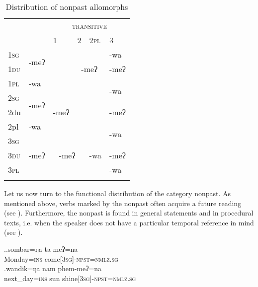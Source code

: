 \begin{table}
\begin{centering} 
\begin{tabular}{llp{1.4cm}p{1.4cm}lp{1.4cm}}
\lsptoprule
		& {\multirow{2}{*}{\scshape intransitive}}&	\multicolumn{4}{c}{ {\scshape transitive}}  \\
		&&	 {\scshape 1}&  {\scshape 2}&  {\scshape 2pl} &  {\scshape 3} \\
\midrule
 {\scshape 1sg} 		&\multirow{2}{*}{-meʔ}& \cellcolor[gray]{.8}&\multicolumn{2}{c}{}&-wa\\
 \cline{1-1} \cline{6-6} 		
 {\scshape 1du}		& & \cellcolor[gray]{.8}&\multicolumn{2}{c}{-meʔ}&-meʔ\\
 \cline{1-2} \cline{6-6} 			
 {\scshape 1pl}		&-wa & \cellcolor[gray]{.8}&\multicolumn{2}{c}{}&\multirow{2}{*}{-wa}\\
 \cline{1-5}				
 {\scshape 2sg} 		&\multirow{2}{*}{-meʔ}&&\multicolumn{2}{c}{\cellcolor[gray]{.8}} &\\
 \cline{1-1} \cline{6-6}			
 {\sc2du}		& &-meʔ& \multicolumn{2}{c}{\cellcolor[gray]{.8}}  &-meʔ\\
 \cline{1-2} \cline{6-6}			
 {\sc2pl}		&-wa &&\multicolumn{2}{c}{\cellcolor[gray]{.8}}  &\multirow{2}{*}{-wa}\\
 \cline{1-5}				
 {\scshape 3sg} 		&&\multicolumn{2}{c}{} &  &\\
  \cline{1-1}  \cline{6-6}					
 {\scshape 3du}&-meʔ&\multicolumn{2}{c}{-meʔ}  &  -wa&-meʔ\\
 \cline{1-1} \cline{6-6}
 {\scshape 3pl}& &\multicolumn{2}{c}{}&  &-wa\\
\lspbottomrule
\end{tabular}
\caption{Distribution of nonpast allomorphs}\label{par-npst-allo}
\end{centering}
\end{table}

Let us now turn to the functional distribution of the category nonpast. As mentioned above, verbs marked by the nonpast  often acquire a future reading (see \Next).  Furthermore, the nonpast is  found in general statements and in procedural texts, i.e. when the speaker does not have a particular temporal reference in mind (see \NNext). 

\ex.\ag.sombar=ŋa ta-meʔ=na\\
Monday{\scshape =ins} come{\scshape [3sg]-npst=nmlz.sg}\\
\bg.wandik=ŋa nam phem-meʔ=na\\
next\_day{\scshape =ins} sun shine{\scshape [3sg]-npst=nmlz.sg}\\

